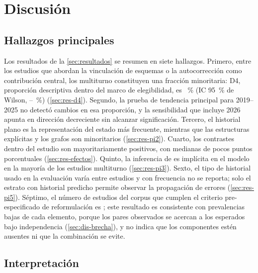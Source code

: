 \section{Discusión}
\label{sec:discusion}

\subsection{Hallazgos principales}
\label{sec:dis-hallazgos}

Los resultados de la \cref{sec:resultados} se resumen en siete hallazgos. Primero, entre los estudios que abordan la vinculación de esquemas o la autocorrección como contribución central, los multiturno constituyen una fracción minoritaria: D4, proporción descriptiva dentro del marco de elegibilidad, es \DcuatroPct~\% (IC 95~\% de Wilson, \DcuatroICinf--\DcuatroICsup~\%) (\cref{sec:res-d4}). Segundo, la prueba de tendencia principal para 2019--2025 no detectó cambios en esa proporción, y la sensibilidad que incluye 2026 apunta en dirección decreciente sin alcanzar significación. Tercero, el historial plano es la representación del estado más frecuente, mientras que las estructuras explícitas y los grafos son minoritarios (\cref{sec:res-pi2}). Cuarto, los contrastes dentro del estudio son mayoritariamente positivos, con medianas de pocos puntos porcentuales (\cref{sec:res-efectos}). Quinto, la inferencia de  es implícita en el modelo en la mayoría de los estudios multiturno (\cref{sec:res-pi3}). Sexto, el tipo de historial usado en la evaluación varía entre estudios y con frecuencia no se reporta; solo el estrato con historial predicho permite observar la propagación de errores (\cref{sec:res-pi5}). Séptimo, el número de estudios del corpus que cumplen el criterio pre-especificado de reformulación es \nBrechaMocho{}; este resultado es consistente con prevalencias bajas de cada elemento, porque los pares observados se acercan a los esperados bajo independencia (\cref{sec:dis-brecha}), y no indica que los componentes estén ausentes ni que la combinación se evite.

\subsection{Interpretación}
\label{sec:dis-interpretacion}

